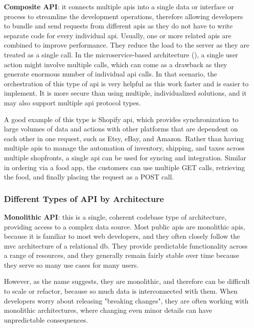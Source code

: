 \begin{multicols}{2}


      \textbf{Composite API}: it connects multiple \acrshort{api}s into a single data or interface or process to
      streamline the development operations, therefore allowing developers to bundle and send requests from different
      \acrshort{api}s as they do not have to write separate code for every individual \acrshort{api}. Usually,
      one or more related \acrshort{api}s are combined to improve performance. They reduce the load to the server
      as they are treated as a single call. In the microservice-based architecture
      (\textit{}), a single user action might involve multiple calls, which can come as
      a drawback as they generate enormous number of individual \acrshort{api} calls. In that scenario, the orchestration
      of this type of \acrshort{api} is very helpful as this work faster and is easier to implement. It is more secure
      than using multiple, individualized solutions, and it may also support multiple \acrshort{api} protocol types.

      A good example of this type is Shopify \acrshort{api}, which provides synchronization to large volumes of data and
      actions with other platforms that are dependent on each other in one request, such as Etsy, eBay, and Amazon. Rather
      than having multiple \acrshort{api}s to manage the automation of inventory, shipping, and taxes across multiple shopfronts,
      a single \acrshort{api} can be used for syncing and integration. Similar in ordering via a food app, the customers can
      use multiple GET calls, retrieving the food, and finally placing the request as a POST call.
      \subsubsection{Different Types of API by Architecture}
      \textbf{Monolithic API}: this is a single, coherent codebase type of architecture, providing access to a complex data
      source. Most public \acrshort{api}s are monolithic \acrshort{api}s, because it is familiar to most web developers, and
      they often closely follow the \acrshort{mvc} architecture of a relational \acrshort{db}. They provide predictable
      functionality across a range of resources, and they generally remain fairly stable over time because they serve so
      many use cases for many users.

      However, as the name suggests, they are monolithic, and therefore can be difficult to scale or refactor, because so much
      data is interconnected with them. When developers worry about releasing "breaking changes", they are often working with
      monolithic architectures, where changing even minor details can have unpredictable consequences.


\end{multicols}
